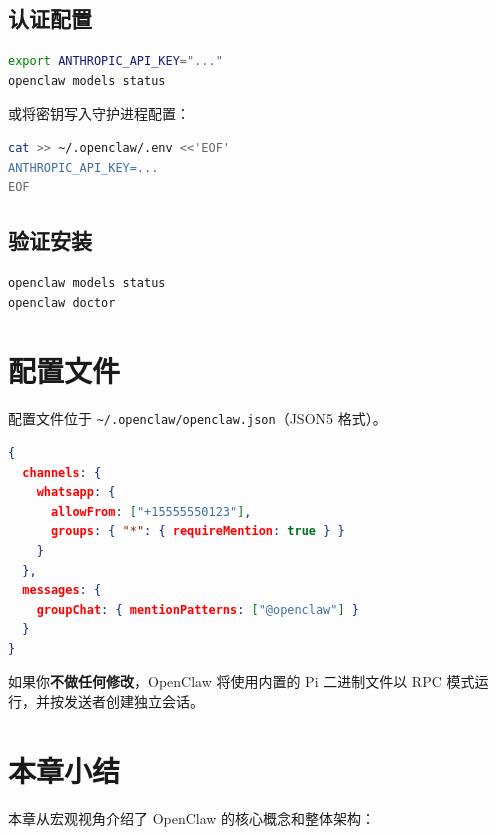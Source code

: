 \subsection*{认证配置}

\begin{lstlisting}[language=bash]
export ANTHROPIC_API_KEY="..."
openclaw models status
\end{lstlisting}

或将密钥写入守护进程配置：

\begin{lstlisting}[language=bash]
cat >> ~/.openclaw/.env <<'EOF'
ANTHROPIC_API_KEY=...
EOF
\end{lstlisting}

\subsection*{验证安装}

\begin{lstlisting}[language=bash]
openclaw models status
openclaw doctor
\end{lstlisting}

\section{配置文件}

配置文件位于 \texttt{\textasciitilde{}/.openclaw/openclaw.json}（JSON5 格式）。

\begin{lstlisting}[language=json]
{
  channels: {
    whatsapp: {
      allowFrom: ["+15555550123"],
      groups: { "*": { requireMention: true } }
    }
  },
  messages: {
    groupChat: { mentionPatterns: ["@openclaw"] }
  }
}
\end{lstlisting}

如果你\textbf{不做任何修改}，OpenClaw 将使用内置的 Pi 二进制文件以 RPC 模式运行，并按发送者创建独立会话。

\section{本章小结}

本章从宏观视角介绍了 OpenClaw 的核心概念和整体架构：

